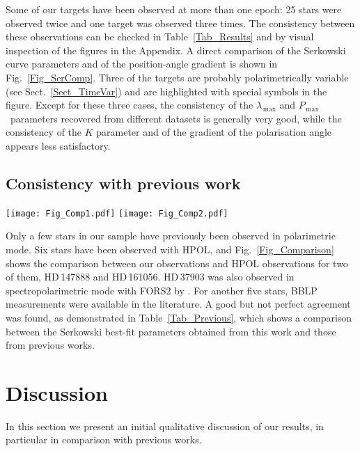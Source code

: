 \documentclass[a4paper]{aa}
\newcommand{\lmax}{\ensuremath{\lambda_\mathrm{\,max}}}
\newcommand{\pmax}{\ensuremath{P_\mathrm{\,max}}}
\begin{document}
Some of our targets have been observed at more than one epoch:
25 stars were observed twice and one target was observed three
times. The consistency between these observations can be checked in
Table~\ref{Tab_Results} and by visual inspection of the figures in
the Appendix. A direct comparison of the Serkowski curve parameters and
of the position-angle gradient is shown in Fig.~\ref{Fig_SerComp}.
Three of the targets are probably polarimetrically variable
(see Sect.~\ref{Sect_TimeVar}) and are highlighted with special
symbols in the figure. Except for these three cases, the
consistency of the $\lmax$ and \pmax\ parameters recovered from different datasets is
generally very good, while the consistency of the $K$ parameter and of
the gradient of the polarisation angle appears less satisfactory.


\subsection{Consistency with previous work}\label{Sect_Cons_Two}
\begin{figure*}[th!]
\begin{center}
\texttt{[image: Fig\_Comp1.pdf]}
\texttt{[image: Fig\_Comp2.pdf]}
\end{center}
\caption{\label{Fig_Comparison} Comparison between FORS2 (blue and red symbols) and HPOL (black symbols) data.
  Black solid lines are best fits with the Serkowski curve to the HPOL data.
  {\it Left panel:} HD\,147888. {\it Right panel:}  HD\,161056.}
\end{figure*}

Only a few stars in our sample have previously been observed in
polarimetric mode. Six stars have been observed with HPOL, and
Fig.~\ref{Fig_Comparison} shows the comparison between our
observations and HPOL observations for two of them, HD\,147888 and
HD\,161056.  HD\,37903 was also observed in spectropolarimetric mode
with FORS2 by \citet{Sieetal14}. For another five stars, BBLP
measurements were available in the literature. A good but not perfect
agreement was found, as demonstrated in Table~\ref{Tab_Previous}, which
shows a comparison between the Serkowski best-fit parameters obtained
from this work and those from previous works. 



\section{Discussion}
In this section we present an initial qualitative discussion of
our results, in particular in comparison with previous works.
\end{document}
